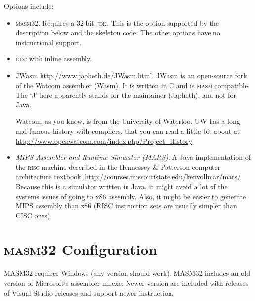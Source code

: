 Options include:

\begin{itemize}

    \item \textsc{masm32}. Requires a 32 bit \textsc{jdk}. This is the
    option supported by the description below and the skeleton code. The
    other options have no instructional support.

    \item \textsc{gcc} with inline assembly.

    \item JWasm \url{http://www.japheth.de/JWasm.html}. JWasm is an
    open-source fork of the Watcom assembler (Wasm). It is written in C
    and is \textsc{masm} compatible. The `J' here apparently stands for
    the maintainer (Japheth), and not for Java. 
    
    Watcom, as you know, is from the University of Waterloo. UW has a
    long and famous history with compilers, that you can read a little
    bit about at
    \url{http://www.openwatcom.com/index.php/Project_History}

    \item \emph{MIPS Assembler and Runtime Simulator (MARS)}. 
    A Java implementation of the \textsc{risc} machine described in the
    Hennessey \& Patterson computer architecture textbook.
    \url{http://courses.missouristate.edu/kenvollmar/mars/} Because this
    is a simulator written in Java, it might avoid a lot of the systems
    issues of going to x86 assembly. Also, it might be easier to
    generate MIPS assembly than x86 (RISC instruction sets are usually
    simpler than CISC ones).

\end{itemize}

\section{\textsc{masm32} Configuration}

\biTight

\item MASM32 requires Windows (any version should work). MASM32 includes an old version of Microsoft's assembler ml.exe. Newer version are included with releases of Visual Studio releases and support newer instruction.

